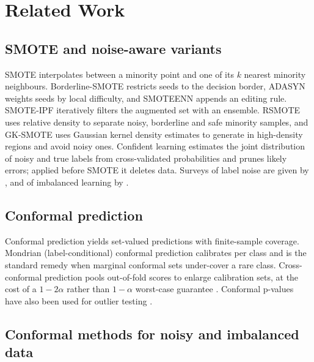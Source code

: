 \documentclass[10pt]{article} %
\begin{document}
\section{Related Work}

\subsection{SMOTE and noise-aware variants}

SMOTE \citep{chawla2002smote} interpolates between a minority point and one of its $k$ nearest minority neighbours. Borderline-SMOTE \citep{han2005borderline} restricts seeds to the decision border, ADASYN \citep{he2008adasyn} weights seeds by local difficulty, and SMOTEENN \citep{batista2004study} appends an editing rule. SMOTE-IPF \citep{saez2015smoteipf} iteratively filters the augmented set with an ensemble. RSMOTE \citep{chen2021rsmote} uses relative density to separate noisy, borderline and safe minority samples, and GK-SMOTE \citep{miraj2025gksmote} uses Gaussian kernel density estimates to generate in high-density regions and avoid noisy ones. Confident learning \citep{northcutt2021confident} estimates the joint distribution of noisy and true labels from cross-validated probabilities and prunes likely errors; applied before SMOTE it deletes data. Surveys of label noise are given by \citet{frenay2014classification}, and of imbalanced learning by \citet{he2009learning}.

\subsection{Conformal prediction}

Conformal prediction \citep{vovk2005algorithmic, lei2018distribution} yields set-valued predictions with finite-sample coverage. Mondrian (label-conditional) conformal prediction \citep{vovk2012conditional} calibrates per class and is the standard remedy when marginal conformal sets under-cover a rare class. Cross-conformal prediction \citep{vovk2015cross} pools out-of-fold scores to enlarge calibration sets, at the cost of a $1-2\alpha$ rather than $1-\alpha$ worst-case guarantee \citep{barber2021predictive}. Conformal p-values have also been used for outlier testing \citep{bates2023testing}.

\subsection{Conformal methods for noisy and imbalanced data}
\end{document}
